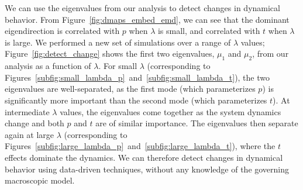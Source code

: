 \documentclass[preprint]{elsarticle}
\begin{document}
%
We can use the eigenvalues from our analysis to detect changes in dynamical behavior.
%
From Figure~\ref{fig:dmaps_embed_emd}, we can see that the dominant eigendirection is correlated with $p$ when $\lambda$ is small, and correlated with $t$ when $\lambda$ is large. 
%
%
We performed a new set of simulations over a range of $\lambda$ values;  
Figure~\ref{fig:detect_change} shows the first two eigenvalues, $\mu_1$ and $\mu_2$, from our analysis as a function of $\lambda$.
%
For small $\lambda$ (corresponding to Figures~\ref{subfig:small_lambda_p}~and~\ref{subfig:small_lambda_t}), the two eigenvalues are well-separated, as the first mode (which parameterizes $p$) is significantly more important than the second mode (which parameterizes $t$).
%
At intermediate $\lambda$ values, the eigenvalues come together as the system dynamics change and both $p$ and $t$ are of similar importance.
%
The eigenvalues then separate again at large $\lambda$ (corresponding to Figures~\ref{subfig:large_lambda_p}~and~\ref{subfig:large_lambda_t}), where the $t$ effects dominate the dynamics.
%
We can therefore detect changes in dynamical behavior using data-driven techniques, without any knowledge of the governing macroscopic model. 
\end{document}
